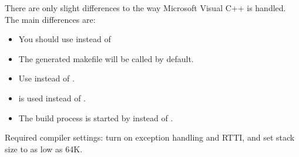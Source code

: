 There are only slight differences to the way Microsoft Visual C++
is handled. The main differences are:
\begin{itemize}
  \item{You should use  instead of }
  \item{The generated makefile will be called  by default.}
  \item{Use  instead of .}
  \item{ is used instead of .}
  \item{The build process is started by  instead of .}
\end{itemize}

Required compiler settings: turn on exception handling and RTTI, and
set stack size to as low as 64K.
\fi

